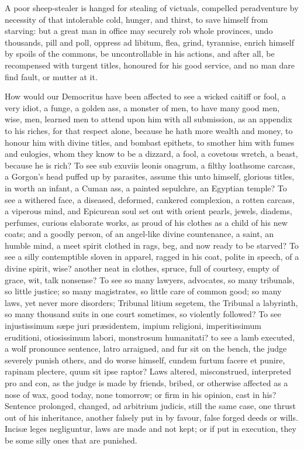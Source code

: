 {A poor sheep-stealer is hanged for stealing of victuals, compelled
peradventure by necessity of that intolerable cold, hunger, and thirst,
to save himself from starving: but a great man in office may
securely rob whole provinces, undo thousands, pill and poll, oppress ad
libitum, flea, grind, tyrannise, enrich himself by spoils of the
commons, be uncontrollable in his actions, and after all, be
recompensed with turgent titles, honoured for his good service, and no
man dare find fault, or  mutter at it.

How would our Democritus have been affected to see a wicked caitiff or
fool, a very idiot, a funge, a golden ass, a monster of men, to
have many good men, wise, men, learned men to attend upon him with all
submission, as an appendix to his riches, for that respect alone,
because he hath more wealth and money, to honour him with divine
titles, and bombast epithets, to smother him with fumes and eulogies,
whom they know to be a dizzard, a fool, a covetous wretch, a beast, \etc{}
because he is rich? To see sub exuviis leonis onagrum, a filthy
loathsome carcass, a Gorgon's head puffed up by parasites, assume this
unto himself, glorious titles, in worth an infant, a Cuman ass, a
painted sepulchre, an Egyptian temple? To see a withered face, a
diseased, deformed, cankered complexion, a rotten carcass, a viperous
mind, and Epicurean soul set out with orient pearls, jewels, diadems,
perfumes, curious elaborate works, as proud of his clothes as a child
of his new coats; and a goodly person, of an angel-like divine
countenance, a saint, an humble mind, a meet spirit clothed in rags,
beg, and now ready to be starved? To see a silly contemptible sloven in
apparel, ragged in his coat, polite in speech, of a divine spirit,
wise? another neat in clothes, spruce, full of courtesy, empty of
grace, wit, talk nonsense?
To see so many lawyers, advocates, so many tribunals, so little
justice; so many magistrates, so little care of common good; so many
laws, yet never more disorders; Tribunal litium segetem, the Tribunal a
labyrinth, so many thousand suits in one court sometimes, so violently
followed? To see injustissimum s\ae{}pe juri pr\ae{}sidentem, impium
religioni, imperitissimum eruditioni, otiosissimum labori, monstrosum
humanitati? to see a lamb executed, a wolf pronounce sentence,
latro arraigned, and fur sit on the bench, the judge severely punish
others, and do worse himself,  cundem furtum facere et punire,
rapinam plectere, quum sit ipse raptor? Laws altered,
misconstrued, interpreted pro and con, as the judge is made by
friends, bribed, or otherwise affected as a nose of wax, good today,
none tomorrow; or firm in his opinion, cast in his? Sentence prolonged,
changed, ad arbitrium judicis, still the same case, one thrust out
of his inheritance, another falsely put in by favour, false forged
deeds or wills. Incis\ae{} leges negliguntur, laws are made and not kept;
or if put in execution, they be some silly ones that are punished.

}
